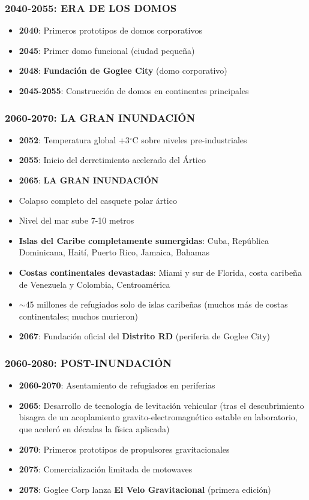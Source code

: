 \documentclass[11pt,a4paper]{report}
\begin{document}
\subsubsection{2040-2055: ERA DE LOS DOMOS}
\begin{itemize}
  \item \textbf{2040}: Primeros prototipos de domos corporativos
  \item \textbf{2045}: Primer domo funcional (ciudad pequeña)
  \item \textbf{2048}: \textbf{Fundación de Goglee City} (domo corporativo)
  \item \textbf{2045-2055}: Construcción de domos en continentes principales

\end{itemize}
\subsubsection{2060-2070: LA GRAN INUNDACIÓN}
\begin{itemize}
  \item \textbf{2052}: Temperatura global +3$^\circ$C sobre niveles pre-industriales
  \item \textbf{2055}: Inicio del derretimiento acelerado del Ártico
  \item \textbf{2065}: \textbf{LA GRAN INUNDACIÓN}
  \item Colapso completo del casquete polar ártico
  \item Nivel del mar sube 7-10 metros
  \item \textbf{Islas del Caribe completamente sumergidas}: Cuba, República Dominicana, Haití, Puerto Rico, Jamaica, Bahamas
  \item \textbf{Costas continentales devastadas}: Miami y sur de Florida, costa caribeña de Venezuela y Colombia, Centroamérica
  \item $\sim$45 millones de refugiados solo de islas caribeñas (muchos más de costas continentales; muchos murieron)
  \item \textbf{2067}: Fundación oficial del \textbf{Distrito RD} (periferia de Goglee City)

\end{itemize}
\subsubsection{2060-2080: POST-INUNDACIÓN}
\begin{itemize}
  \item \textbf{2060-2070}: Asentamiento de refugiados en periferias
  \item \textbf{2065}: Desarrollo de tecnología de levitación vehicular (tras el descubrimiento bisagra de un acoplamiento gravito-electromagnético estable en laboratorio, que aceleró en décadas la física aplicada)
  \item \textbf{2070}: Primeros prototipos de propulsores gravitacionales
  \item \textbf{2075}: Comercialización limitada de motowaves
  \item \textbf{2078}: Goglee Corp lanza \textbf{El Velo Gravitacional} (primera edición)

\end{itemize}
\end{document}
